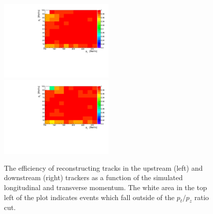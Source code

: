   \begin{figure}[p]
    \centering
    \includegraphics[width=0.495\textwidth, angle=0]{08-Performance/upstream_track_efficiency.pdf}
    \includegraphics[width=0.495\textwidth, angle=0]{08-Performance/downstream_track_efficiency.pdf}\\
    \caption{\label{fig:track_efficiency} The efficiency of reconstructing tracks in the upstream (left) and downstream (right) trackers as a function of the simulated longitudinal and transverse momentum. The white area in the top left of the plot indicates events which fall outside of the $p_t/p_z$ ratio cut.}
  \end{figure}
  
  
  
